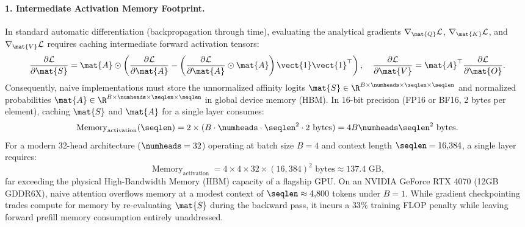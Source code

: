 \paragraph{1. Intermediate Activation Memory Footprint.}
In standard automatic differentiation (backpropagation through time), evaluating the analytical gradients $\nabla_{\mat{Q}} \mathcal{L}$, $\nabla_{\mat{K}} \mathcal{L}$, and $\nabla_{\mat{V}} \mathcal{L}$ requires caching intermediate forward activation tensors:
\begin{equation}
\frac{\partial \mathcal{L}}{\partial \mat{S}} = \mat{A} \odot \left( \frac{\partial \mathcal{L}}{\partial \mat{A}} - \left( \frac{\partial \mathcal{L}}{\partial \mat{A}} \odot \mat{A} \right) \vect{1} \vect{1}^\top \right), \quad \frac{\partial \mathcal{L}}{\partial \mat{V}} = \mat{A}^\top \frac{\partial \mathcal{L}}{\partial \mat{O}}.
\end{equation}
Consequently, naive implementations must store the unnormalized affinity logits $\mat{S} \in \R^{B \times \numheads \times \seqlen \times \seqlen}$ and normalized probabilities $\mat{A} \in \R^{B \times \numheads \times \seqlen \times \seqlen}$ in global device memory (HBM). In 16-bit precision (FP16 or BF16, 2 bytes per element), caching $\mat{S}$ and $\mat{A}$ for a single layer consumes:
\begin{equation}
\operatorname{Memory}_{\text{activation}}(\seqlen) = 2 \times (B \cdot \numheads \cdot \seqlen^2 \cdot 2\text{ bytes}) = 4 B \numheads \seqlen^2 \text{ bytes}.
\label{eq:activation_memory_bytes}
\end{equation}
For a modern 32-head architecture ($\numheads = 32$) operating at batch size $B = 4$ and context length $\seqlen = 16{,}384$, a single layer requires:
\begin{equation}
\operatorname{Memory}_{\text{activation}} = 4 \times 4 \times 32 \times (16{,}384)^2 \text{ bytes} \approx 137.4\text{ GB},
\end{equation}
far exceeding the physical High-Bandwidth Memory (HBM) capacity of a flagship GPU. On an NVIDIA GeForce RTX 4070 (12GB GDDR6X), naive attention overflows memory at a modest context of $\seqlen \approx 4{,}800$ tokens under $B=1$. While gradient checkpointing trades compute for memory by re-evaluating $\mat{S}$ during the backward pass, it incurs a $33\%$ training FLOP penalty while leaving forward prefill memory consumption entirely unaddressed.

